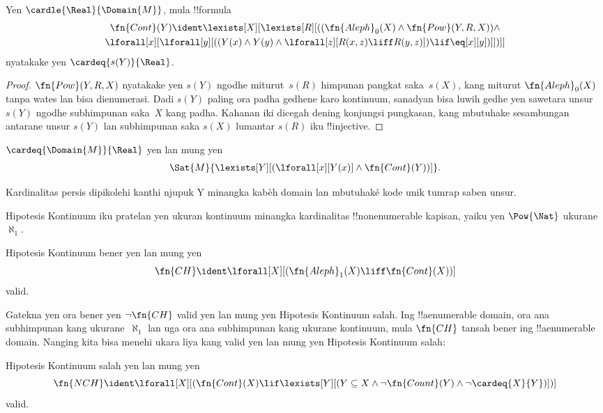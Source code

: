 \documentclass[../../../include/open-logic-section]{subfiles}
\begin{document}
\begin{prop}
Yen $\cardle{\Real}{\Domain{M}}$, mula
!!{formula}
\begin{multline*}
\fn{Cont}(Y) \ident
\lexists[X][\lexists[R][((\fn{Aleph}_0(X) \land
      \fn{Pow}(Y, R, X)) \land \\
      \lforall[x][\lforall[y][((Y(x) \land {}
      Y(y) \land \lforall[z][R(x,z) \liff R(y,z)]) \lif \eq[x][y])]])]]
\end{multline*}
nyatakake yen $\cardeq{s(Y)}{\Real}$.
\end{prop}

\begin{proof}
  $\fn{Pow}(Y, R, X)$ nyatakake yen $s(Y)$ ngodhe
  miturut~$s(R)$ himpunan pangkat
  saka~$s(X)$, kang miturut $\fn{Aleph}_0(X)$
  tanpa wates lan bisa dienumerasi. Dadi $s(Y)$ paling ora
  padha gedhene karo kontinuum, sanadyan bisa
  luwih gedhe yen sawetara unsur $s(Y)$ ngodhe
  subhimpunan saka~$X$ kang padha.
  Kahanan iki dicegah dening konjungsi pungkasan,
  kang mbutuhake sesambungan antarane unsur
  $s(Y)$ lan subhimpunan saka $s(X)$ lumantar
  $s(R)$ iku !!{injective}.
\end{proof}

\begin{prop}
 $\cardeq{\Domain{M}}{\Real}$ yen lan mung yen
\begin{multline*}
  \Sat{M}{\lexists[Y][(\lforall[x][Y(x)] \land \fn{Cont}(Y))]}.
\end{multline*}
\end{prop}
Kardinalitas persis dipikolehi kanthi njupuk Y minangka kabèh domain lan mbutuhaké kode unik tumrap saben unsur.

\begin{explain}
Hipotesis Kontinuum iku pratelan yen ukuran
kontinuum minangka kardinalitas !!{nonenumerable}
kapisan, yaiku yen $\Pow{\Nat}$
ukurane~$\aleph_1$.
\end{explain}

\begin{prop}
Hipotesis Kontinuum bener yen lan mung yen
\[\fn{CH} \ident
\lforall[X][(\fn{Aleph}_1(X) \liff \fn{Cont}(X))]\]
valid.
\end{prop}

Gatekna yen ora bener yen $\lnot \fn{CH}$
valid yen lan mung yen Hipotesis Kontinuum
salah. Ing !!a{enumerable} domain, ora ana
subhimpunan kang ukurane~$\aleph_1$ lan
uga ora ana subhimpunan kang ukurane
kontinuum, mula $\fn{CH}$ tansah bener
ing !!a{enumerable} domain. Nanging kita
bisa menehi ukara liya kang valid yen lan
mung yen Hipotesis Kontinuum salah:

\begin{prop}
Hipotesis Kontinuum salah yen lan mung yen
\[\fn{NCH} \ident
\lforall[X][(\fn{Cont}(X) \lif \lexists[Y][(Y \subseteq X \land \lnot
    \fn{Count}(Y) \land \lnot \cardeq{X}{Y})])]\]
valid.
\end{prop}
\end{document}
